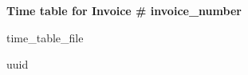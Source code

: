 \documentclass[11pt]{article}
\begin{document}
\begin{center}
  \LARGE
  \textbf{Time table for Invoice \# {{invoice_number}}}
\end{center}

\vspace{1cm}

\begin{center}
  \small
  {{{ time_table_file }}}
\end{center}

\vspace{1cm}

\vfill
\begin{center}
  \tiny
  {{uuid}}
\end{center}
\end{document}
